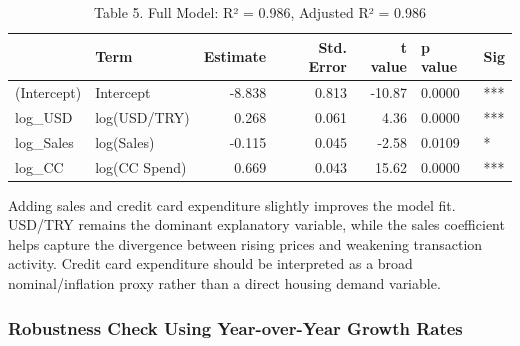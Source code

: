 \documentclass[
  11pt,
  a4paper,
  DIV=11,
  numbers=noendperiod]{scrartcl}
\begin{document}
\begin{longtable}[t]{llrrrll}
\caption{\label{tab:model2}Table 5. Full Model: R² = 0.986, Adjusted R² = 0.986}\\
\toprule
 & Term & Estimate & Std. Error & t value & p value & Sig\\
\midrule
(Intercept) & Intercept & -8.838 & 0.813 & -10.87 & 0.0000 & ***\\
log\_USD & log(USD/TRY) & 0.268 & 0.061 & 4.36 & 0.0000 & ***\\
log\_Sales & log(Sales) & -0.115 & 0.045 & -2.58 & 0.0109 & *\\
log\_CC & log(CC Spend) & 0.669 & 0.043 & 15.62 & 0.0000 & ***\\
\bottomrule
\end{longtable}

Adding sales and credit card expenditure slightly improves the model
fit. USD/TRY remains the dominant explanatory variable, while the sales
coefficient helps capture the divergence between rising prices and
weakening transaction activity. Credit card expenditure should be
interpreted as a broad nominal/inflation proxy rather than a direct
housing demand variable.

\subsubsection{Robustness Check Using Year-over-Year Growth
Rates}\label{robustness-check-using-year-over-year-growth-rates}
\end{document}
